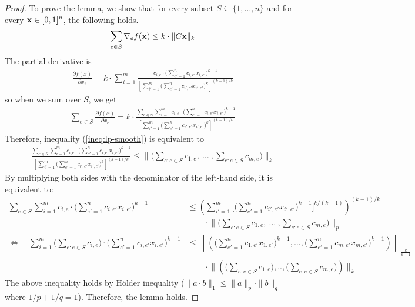 \begin{proof}
To prove the lemma, we show that for every subset $S \subseteq \{1, \ldots, n\}$ and for every $\mathbf{x} \in [0,1]^{n}$, the following holds.
%
\begin{align}	\label{ineq:lp-smooth}
\sum_{e \in S} \nabla_{e} f(\mathbf{x}) \leq  k \cdot \|C \mathbf{x}\|_{k}
\end{align}
%
The partial derivative is
%
\begin{align*}
\frac{\partial f(x)}{\partial x_{e}}
= k \cdot \sum_{i = 1}^{m} \frac{c_{i,e} \cdot \bigl( \sum_{e' = 1}^{n} c_{i,e'} x_{i,e'} \bigr)^{k-1} }{ \left[ \sum_{i' = 1}^{m}
		\bigl( \sum_{e'= 1}^{n} c_{i',e'} x_{i',e'} \bigr)^{k} \right]^{(k-1)/k}}
\end{align*}
so when we sum over $S$, we get
\begin{align*}
\sum_{e \in S} \frac{\partial f(x)}{\partial x_{e}}
= k \cdot \frac{ \sum_{e \in S} \sum_{i = 1}^{m} c_{i,e} \cdot \bigl( \sum_{e' = 1}^{n} c_{i,e'} x_{i,e'} \bigr)^{k-1} }{ \left[ \sum_{i' = 1}^{m} \bigl( \sum_{e'= 1}^{n} c_{i',e'} x_{i',e'} \bigr)^{k} \right]^{(k-1)/k}}
\end{align*}
%
Therefore, inequality (\ref{ineq:lp-smooth}) is equivalent to
\begin{align*}
\frac{ \sum_{e \in S} \sum_{i = 1}^{m} c_{i,e} \cdot \bigl( \sum_{e' = 1}^{n} c_{i,e'} x_{i,e'} \bigr)^{k-1} }{ \left[ \sum_{i' = 1}^{m} \bigl( \sum_{e'= 1}^{n} c_{i',e'} x_{i',e'} \bigr)^{k} \right]^{(k-1)/k}}
	\leq   \biggl \| \biggl( \sum_{e: e \in S} c_{1,e},\ \ldots\ , \sum_{e: e \in S} c_{m,e}  \biggr) \biggr \|_{k}
\end{align*}
%
By multiplying both sides with the denominator of the left-hand side, it is equivalent to:
%
\begin{align*}
\sum_{e \in S} \sum_{i = 1}^{m} c_{i,e} \cdot \bigl( \sum_{e' = 1}^{n} c_{i,e'} x_{i,e'} \bigr)^{k-1}
&\leq
        \left ( \sum_{i'=1}^{m} \biggl [ \biggl( \sum_{e'= 1}^{n} c_{i',e'} x_{i',e'} \biggr)^{k-1} \biggr ]^{k/(k-1)} \right )^{(k-1)/k} \\
        			& \qquad \cdot \biggl \| \biggl( \sum_{e: e \in S} c_{1,e}, \ \ldots\ , \sum_{e: e \in S} c_{m,e}  \biggr) \biggr \|_{p} \\
 \Leftrightarrow \quad  \sum_{i=1}^{m} \biggl( \sum_{e: e \in S} c_{i,e} \biggr) \cdot \biggl( \sum_{e'=1}^{n} c_{i,e'} x_{i,e'} \biggr)^{k-1}
 &\leq
        \left \| \left( \biggl( \sum_{e'=1}^{n} c_{1,e'} x_{1,e'} \biggr)^{k-1}, \ldots, \biggl( \sum_{e'=1}^{n} c_{m,e'} x_{m,e'} \biggr)^{k-1} \right)   \right \|_{\frac{k}{k-1}} \\
        		& \qquad \cdot \biggl \| \left( \biggl(\sum_{e: e \in S} c_{1,e} \biggr) ,.., \biggl( \sum_{e: e \in S} c_{m,e}\biggr)  \right) \biggr \|_{k}
\end{align*}
The above inequality holds by H\"older inequality ($\| a \cdot b\|_{1} \leq \| a \|_{p} \cdot \| b \|_{q}$ where $1/p + 1/q = 1$).
Therefore, the lemma holds.
\end{proof}

